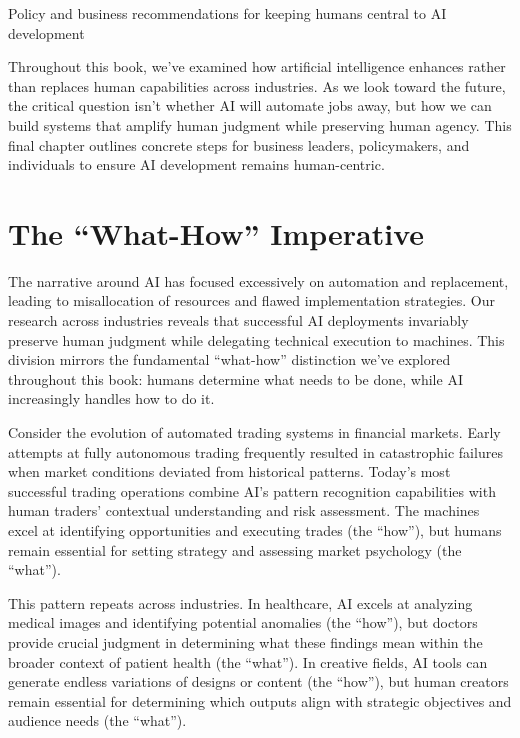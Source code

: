 \documentclass[
  Letterpaper,
]{scrbook}
\begin{document}
Policy and business recommendations for keeping humans central to AI
development

\hfill\break

Throughout this book, we've examined how artificial intelligence
enhances rather than replaces human capabilities across industries. As
we look toward the future, the critical question isn't whether AI will
automate jobs away, but how we can build systems that amplify human
judgment while preserving human agency. This final chapter outlines
concrete steps for business leaders, policymakers, and individuals to
ensure AI development remains human-centric.

\section{The ``What-How'' Imperative}\label{the-what-how-imperative}

The narrative around AI has focused excessively on automation and
replacement, leading to misallocation of resources and flawed
implementation strategies. Our research across industries reveals that
successful AI deployments invariably preserve human judgment while
delegating technical execution to machines. This division mirrors the
fundamental ``what-how'' distinction we've explored throughout this
book: humans determine what needs to be done, while AI increasingly
handles how to do it.

Consider the evolution of automated trading systems in financial
markets. Early attempts at fully autonomous trading frequently resulted
in catastrophic failures when market conditions deviated from historical
patterns. Today's most successful trading operations combine AI's
pattern recognition capabilities with human traders' contextual
understanding and risk assessment. The machines excel at identifying
opportunities and executing trades (the ``how''), but humans remain
essential for setting strategy and assessing market psychology (the
``what'').

This pattern repeats across industries. In healthcare, AI excels at
analyzing medical images and identifying potential anomalies (the
``how''), but doctors provide crucial judgment in determining what these
findings mean within the broader context of patient health (the
``what''). In creative fields, AI tools can generate endless variations
of designs or content (the ``how''), but human creators remain essential
for determining which outputs align with strategic objectives and
audience needs (the ``what'').
\end{document}
